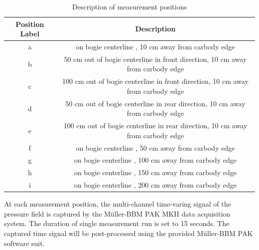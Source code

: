\begin{table}[H]
\begin{tabular}{|c|c|}
\hline
Position Label & Description                                                                     \\ \hline
a              & on bogie centerline , 10 cm away from carbody edge                              \\ \hline
b              & 50 cm out of bogie centerline in front direction, 10 cm away from carbody edge  \\ \hline
c              & 100 cm out of bogie centerline in front direction, 10 cm away from carbody edge \\ \hline
d              & 50 cm out of bogie centerline in rear direction, 10 cm away from carbody edge   \\ \hline
e              & 100 cm out of bogie centerline in rear direction, 10 cm away from carbody edge  \\ \hline
f              & on bogie centerline , 50 cm away from carbody edge                              \\ \hline
g              & on bogie centerline , 100 cm away from carbody edge                             \\ \hline
h              & on bogie centerline , 150 cm away from carbody edge                             \\ \hline
i              & on bogie centerline , 200 cm away from carbody edge                             \\ \hline
\end{tabular}
\caption{Description of measurement positions}
\label{tab:measurement_positons}
\end{table}

At each measurement position, the multi-channel time-varing signal of the pressure field is captured by the Müller-BBM PAK MKII data acquisition system. The duration of single measurement run is set to 15 seconds. The captured time signal will be post-processed using the provided Müller-BBM PAK software suit.

